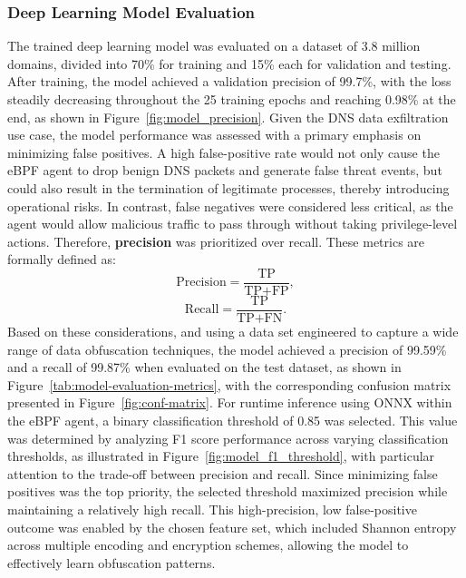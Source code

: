 \documentclass[letterpaper,twocolumn,10pt]{article}
\begin{document}
\subsubsection{Deep Learning Model Evaluation}
The trained deep learning model was evaluated on a dataset of 3.8 million domains, divided into 70\% for training and 15\% each for validation and testing. After training, the model achieved a validation precision of 99.7\%, with the loss steadily decreasing throughout the 25 training epochs and reaching 0.98\% at the end, as shown in Figure~\ref{fig:model_precision}. Given the DNS data exfiltration use case, the model performance was assessed with a primary emphasis on minimizing false positives. A high false-positive rate would not only cause the eBPF agent to drop benign DNS packets and generate false threat events, but could also result in the termination of legitimate processes, thereby introducing operational risks. In contrast, false negatives were considered less critical, as the agent would allow malicious traffic to pass through without taking privilege-level actions. Therefore, \textbf{precision} was prioritized over recall. These metrics are formally defined as:
\[
\text{Precision} = \frac{\text{TP}}{\text{TP} + \text{FP}},
\]
\[
\text{Recall} = \frac{\text{TP}}{\text{TP} + \text{FN}}.
\]
Based on these considerations, and using a data set engineered to capture a wide range of data obfuscation techniques, the model achieved a precision of 99.59\% and a recall of 99.87\% when evaluated on the test dataset, as shown in Figure~\ref{tab:model-evaluation-metrics}, with the corresponding confusion matrix presented in Figure~\ref{fig:conf-matrix}.
For runtime inference using ONNX within the eBPF agent, a binary classification threshold of 0.85 was selected. This value was determined by analyzing F1 score performance across varying classification thresholds, as illustrated in Figure~\ref{fig:model_f1_threshold}, with particular attention to the trade-off between precision and recall. Since minimizing false positives was the top priority, the selected threshold maximized precision while maintaining a relatively high recall.
This high-precision, low false-positive outcome was enabled by the chosen feature set, which included Shannon entropy across multiple encoding and encryption schemes, allowing the model to effectively learn obfuscation patterns.
\end{document}
